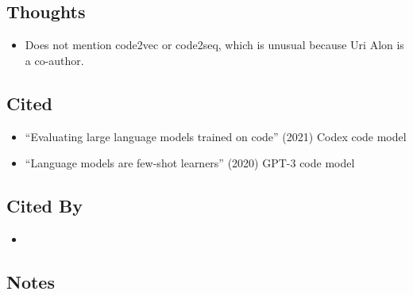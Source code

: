 \documentclass{article}
\begin{document}
\subsection*{Thoughts}
\begin{itemize}
\item Does not mention code2vec or code2seq, which is unusual because Uri Alon is a co-author.
\end{itemize}

\subsection*{Cited}
\begin{itemize}
\item ``Evaluating large language models trained on code'' (2021) Codex code model
\item ``Language models are few-shot learners'' (2020) GPT-3 code model
\end{itemize}

\subsection*{Cited By}
\begin{itemize}
\item
\end{itemize}

\subsection*{Notes}
\end{document}
